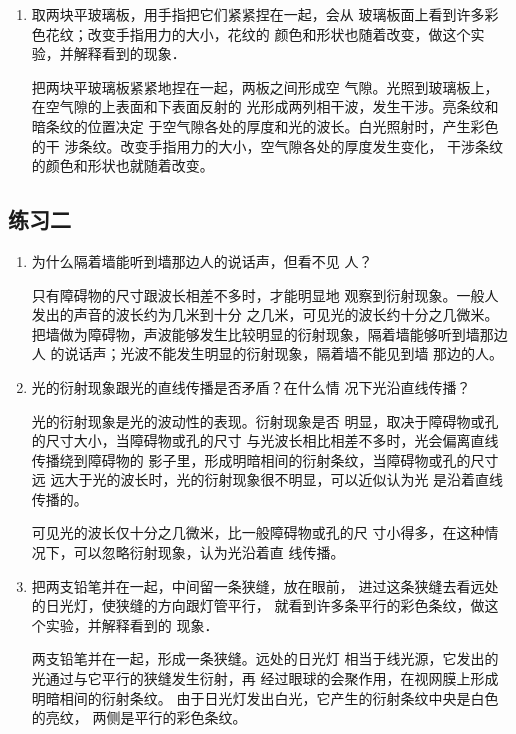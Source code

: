 \begin{enumerate}
\item 取两块平玻璃板，用手指把它们紧紧捏在一起，会从
玻璃板面上看到许多彩色花纹；改变手指用力的大小，花纹的
颜色和形状也随着改变，做这个实验，并解释看到的现象．


\begin{solution}
把两块平玻璃板紧紧地捏在一起，两板之间形成空
气隙。光照到玻璃板上，在空气隙的上表面和下表面反射的
光形成两列相干波，发生干涉。亮条纹和暗条纹的位置决定
于空气隙各处的厚度和光的波长。白光照射时，产生彩色的干
涉条纹。改变手指用力的大小，空气隙各处的厚度发生变化，
干涉条纹的颜色和形状也就随着改变。
\end{solution}

\end{enumerate}


\subsection{练习二}
\begin{enumerate}
\item 为什么隔着墙能听到墙那边人的说话声，但看不见
人？

\begin{solution}
    只有障碍物的尺寸跟波长相差不多时，才能明显地
    观察到衍射现象。一般人发出的声音的波长约为几米到十分
    之几米，可见光的波长约十分之几微米。把墙做为障碍物，声波能够发生比较明显的衍射现象，隔着墙能够听到墙那边人
    的说话声；光波不能发生明显的衍射现象，隔着墙不能见到墙
    那边的人。
\end{solution}
\item 光的衍射现象跟光的直线传播是否矛盾？在什么情
况下光沿直线传播？

\begin{solution}
    光的衍射现象是光的波动性的表现。衍射现象是否
    明显，取决于障碍物或孔的尺寸大小，当障碍物或孔的尺寸
    与光波长相比相差不多时，光会偏离直线传播绕到障碍物的
    影子里，形成明暗相间的衍射条纹，当障碍物或孔的尺寸远
    远大于光的波长时，光的衍射现象很不明显，可以近似认为光
    是沿着直线传播的。

    可见光的波长仅十分之几微米，比一般障碍物或孔的尺
    寸小得多，在这种情况下，可以忽略衍射现象，认为光沿着直
    线传播。
\end{solution}
\item 把两支铅笔并在一起，中间留一条狭缝，放在眼前，
进过这条狭缝去看远处的日光灯，使狭缝的方向跟灯管平行，
就看到许多条平行的彩色条纹，做这个实验，并解释看到的
现象．

\begin{solution}
    两支铅笔并在一起，形成一条狭缝。远处的日光灯
    相当于线光源，它发出的光通过与它平行的狭缝发生衍射，再
    经过眼球的会聚作用，在视网膜上形成明暗相间的衍射条纹。
    由于日光灯发出白光，它产生的衍射条纹中央是白色的亮纹，
    两侧是平行的彩色条纹。
\end{solution}
\end{enumerate}



